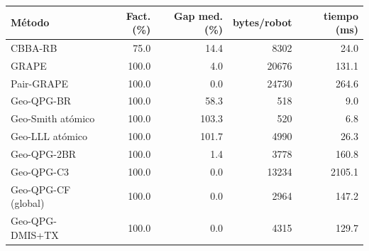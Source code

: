 \begin{tabular}{@{}lrrrr@{}}
\toprule
Método & Fact. (\%) & Gap med. (\%) & bytes/robot & tiempo (ms) \\
\midrule
CBBA-RB & 75.0 & 14.4 & 8302 & 24.0 \\
GRAPE & 100.0 & 4.0 & 20676 & 131.1 \\
Pair-GRAPE & 100.0 & 0.0 & 24730 & 264.6 \\
Geo-QPG-BR & 100.0 & 58.3 & 518 & 9.0 \\
Geo-Smith atómico & 100.0 & 103.3 & 520 & 6.8 \\
Geo-LLL atómico & 100.0 & 101.7 & 4990 & 26.3 \\
Geo-QPG-2BR & 100.0 & 1.4 & 3778 & 160.8 \\
Geo-QPG-C3 & 100.0 & 0.0 & 13234 & 2105.1 \\
Geo-QPG-CF (global) & 100.0 & 0.0 & 2964 & 147.2 \\
Geo-QPG-DMIS+TX & 100.0 & 0.0 & 4315 & 129.7 \\
\bottomrule
\end{tabular}
